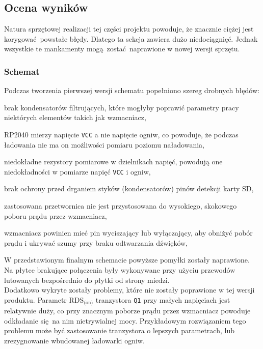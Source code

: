 \documentclass[polish]{aghengthesis}
\let\tempone\itemize
\let\temptwo\enditemize
\renewenvironment{itemize}{\tempone\setlength{\itemsep}{0cm}}{\temptwo}
\begin{document}
		\subsection{Ocena wyników}
			Natura sprzętowej realizacji tej części projektu powoduje, że znacznie ciężej jest korygować powstałe błędy. Dlatego ta sekcja zawiera dużo niedociągnięć. Jednak wszystkie te mankamenty mogą zostać naprawione w nowej wersji sprzętu.
			
			\subsubsection{Schemat}
				\noindent
				Podczas tworzenia pierwszej wersji schematu popełniono szereg drobnych błędów:
				\begin{itemize}
					\item brak kondensatorów filtrujących, które mogłyby poprawić parametry pracy niektórych elementów takich jak wzmacniacz,
					\item RP2040 mierzy napięcie \lstinline|VCC| a nie napięcie ogniw, co powoduje, że podczas ładowania nie ma on możliwości pomiaru poziomu naładowania,
					\item niedokładne rezystory pomiarowe w dzielnikach napięć, powodują one niedokładności w pomiarze napięć \lstinline|VCC| i ogniw,
					\item brak ochrony przed drganiem styków (kondensatorów) pinów detekcji karty SD,
					\item zastosowana przetwornica nie jest przystosowana do wysokiego, skokowego poboru prądu przez wzmacniacz,
					\item wzmacniacz powinien mieć pin wyciszający lub wyłączający, aby obniżyć pobór prądu i ukrywać szumy przy braku odtwarzania dźwięków,
				\end{itemize}
				
				W przedstawionym finalnym schemacie powyższe pomyłki zostały naprawione. Na płytce brakujące połączenia były wykonywane przy użyciu przewodów lutowanych bezpośrednio do płytki od strony miedzi.
				$ $\\
				
				Dodatkowo wykryte zostały problemy, które nie zostały poprawione w tej wersji produktu. Parametr $\text{RDS}_{\text{(on)}}$ tranzystora \lstinline|Q1| przy małych napięciach jest relatywnie duży, co przy znacznym poborze prądu przez wzmacniacz powoduje odkładanie się na nim nietrywialnej mocy. Przykładowym rozwiązaniem tego problemu może być zastosowanie tranzystora o lepszych parametrach, lub zrezygnowanie wbudowanej ładowarki ogniw.
				$ $\\
				
\end{document}
